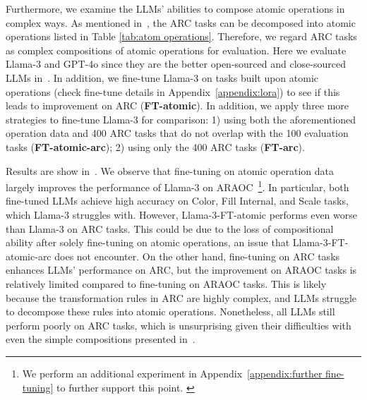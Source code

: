 Furthermore, we examine the LLMs' abilities to compose atomic operations in complex ways. As mentioned in~, the ARC tasks can be decomposed into atomic operations listed in Table \ref{tab:atom operations}. Therefore, we regard ARC tasks as complex compositions of atomic operations for evaluation. Here we evaluate Llama-3 and GPT-4o since they are the better open-sourced and close-sourced LLMs in~.
In addition, %
we fine-tune Llama-3 on tasks built upon atomic operations (check fine-tune details in Appendix~\ref{appendix:lora}) to see if this leads to improvement on ARC (\textbf{FT-atomic}).
In addition, we apply three more strategies to fine-tune Llama-3 for comparison: 1) using both the aforementioned operation data and 400 ARC tasks that do not overlap with the 100 evaluation tasks (\textbf{FT-atomic-arc}); 2) using only the 400 ARC tasks (\textbf{FT-arc}).

Results are show in~. We observe that fine-tuning on atomic operation data largely improves the performance of Llama-3 on ARAOC~\footnote{\scriptsize{We perform an additional experiment in Appendix~\ref{appendix:further fine-tuning} to further support this point.
}}. In particular, both fine-tuned LLMs achieve high accuracy on Color, Fill Internal, and Scale tasks, which Llama-3 struggles with. However, Llama-3-FT-atomic performs even worse than Llama-3 on ARC tasks. This could be due to the loss of compositional ability after solely fine-tuning on atomic operations, an issue that Llama-3-FT-atomic-arc does not encounter. On the other hand, fine-tuning on ARC tasks enhances LLMs' performance on ARC, but the improvement on ARAOC tasks is relatively limited compared to fine-tuning on ARAOC tasks. This is likely because the transformation rules in ARC are highly complex, and LLMs struggle to decompose these rules into atomic operations. Nonetheless, all LLMs still perform poorly on ARC tasks, which is unsurprising given their difficulties with even the simple compositions presented in~.
 
